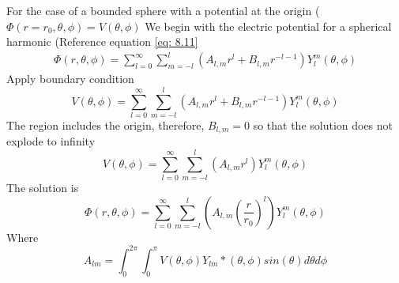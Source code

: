 \documentclass[12pt]{article}
\begin{document}
    For the case of a bounded sphere with a potential at the origin ($\Phi(r=r_0, \theta, \phi) = V(\theta, \phi)$
    \newline We begin with the electric potential for a spherical harmonic (Reference equation \ref{eq: 8.11}
    \begin{gather*}
        \Phi(r,\theta, \phi) = \sum_{l=0}^{\infty} \sum_{m=-l}^l (A_{l,m} r^l + B_{l,m} r^{-l-1}) Y_{l}^{m}(\theta, \phi)
    \end{gather*}
    Apply boundary condition
    \begin{equation} \label{eq: 9.10}
        V(\theta, \phi) = \sum_{l=0}^{\infty} \sum_{m=-l}^l (A_{l,m} r^l + B_{l,m} r^{-l-1}) Y_{l}^{m}(\theta, \phi)
    \end{equation}
    The region includes the origin, therefore, $B_{l,m}=0$ so that the solution does not explode to infinity
    \begin{equation} \label{eq: 9.11}
        V(\theta, \phi) = \sum_{l=0}^{\infty} \sum_{m=-l}^l (A_{l,m} r^l) Y_{l}^{m}(\theta, \phi)
    \end{equation}
    The solution is 
    \begin{equation} \label{eq: 9.12}
        \Phi(r,\theta, \phi) = \sum_{l=0}^{\infty} \sum_{m=-l}^l (A_{l,m} (\frac{r}{r_0})^l) Y_{l}^{m}(\theta, \phi)
    \end{equation}
    Where 
    \begin{equation} \label{eq: 9.13}
        A_{lm} = \int_0^{2\pi} \int_0^\pi V(\theta, \phi) Y_{lm}*(\theta,\phi) sin(\theta) d\theta d\phi
    \end{equation}
\end{document}

